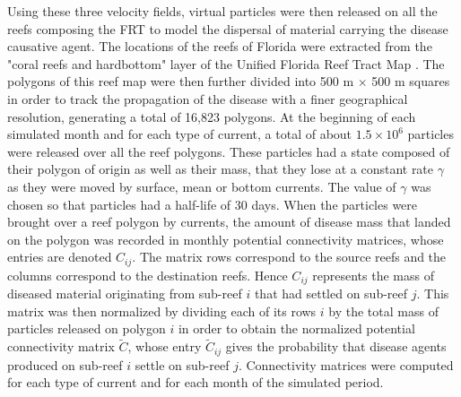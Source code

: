 Using these three velocity fields, virtual particles were then released on all the reefs composing the FRT to model the dispersal of material carrying the disease causative agent. The locations of the reefs of Florida were extracted from the "coral reefs and hardbottom" layer of the Unified Florida Reef Tract Map \citep{fwc2017unified}. The polygons of this reef map were then further divided into 500 m $\times$ 500 m squares in order to track the propagation of the disease with a finer geographical resolution, generating a total of 16,823 polygons. At the beginning of each simulated month and for each type of current, a total of about $1.5 \times 10^6$ particles were released over all the reef polygons. These particles had a state composed of their polygon of origin as well as their mass, that they lose at a constant rate $\gamma$ as they were moved by surface, mean or bottom currents. The value of $\gamma$ was chosen so that particles had a half-life of 30 days. When the particles were brought over a reef polygon by currents, the amount of disease mass that landed on the polygon was recorded in monthly potential connectivity matrices, whose entries are denoted $C_{ij}$. The matrix rows correspond to the source reefs and the columns correspond to the destination reefs. Hence $C_{ij}$ represents the mass of diseased material originating from sub-reef $i$ that had settled on sub-reef $j$. This matrix was then normalized by dividing each of its rows $i$ by the total mass of particles released on polygon $i$ in order to obtain the normalized potential connectivity matrix $\tilde{C}$, whose entry $\tilde{C}_{ij}$ gives the probability that disease agents produced on sub-reef $i$ settle on sub-reef $j$. Connectivity matrices were computed for each type of current and for each month of the simulated period.


